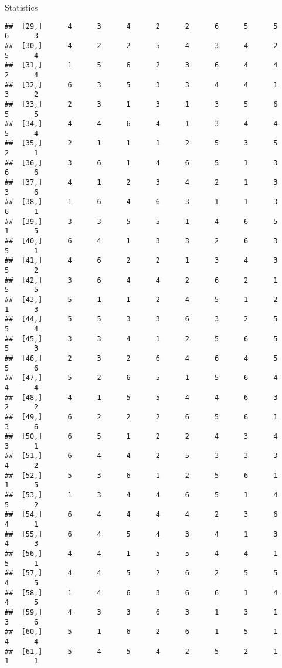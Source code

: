 \documentclass[
  ignorenonframetext,
]{beamer}
\begin{document}
\begin{frame}[fragile]{Statistics}
\begin{verbatim}
##  [29,]      4      3      4      2      2      6      5      5      6      3
##  [30,]      4      2      2      5      4      3      4      2      5      4
##  [31,]      1      5      6      2      3      6      4      4      2      4
##  [32,]      6      3      5      3      3      4      4      1      3      2
##  [33,]      2      3      1      3      1      3      5      6      5      5
##  [34,]      4      4      6      4      1      3      4      4      5      4
##  [35,]      2      1      1      1      2      5      3      5      2      1
##  [36,]      3      6      1      4      6      5      1      3      6      6
##  [37,]      4      1      2      3      4      2      1      3      3      6
##  [38,]      1      6      4      6      3      1      1      3      6      1
##  [39,]      3      3      5      5      1      4      6      5      1      5
##  [40,]      6      4      1      3      3      2      6      3      5      1
##  [41,]      4      6      2      2      1      3      4      3      5      2
##  [42,]      3      6      4      4      2      6      2      1      5      5
##  [43,]      5      1      1      2      4      5      1      2      1      3
##  [44,]      5      5      3      3      6      3      2      5      5      4
##  [45,]      3      3      4      1      2      5      6      5      5      3
##  [46,]      2      3      2      6      4      6      4      5      5      6
##  [47,]      5      2      6      5      1      5      6      4      4      4
##  [48,]      4      1      5      5      4      4      6      3      2      2
##  [49,]      6      2      2      2      6      5      6      1      3      6
##  [50,]      6      5      1      2      2      4      3      4      3      1
##  [51,]      6      4      4      2      5      3      3      3      4      2
##  [52,]      5      3      6      1      2      5      6      1      1      5
##  [53,]      1      3      4      4      6      5      1      4      5      2
##  [54,]      6      4      4      4      4      2      3      6      4      1
##  [55,]      6      4      5      4      3      4      1      3      4      3
##  [56,]      4      4      1      5      5      4      4      1      5      1
##  [57,]      4      4      5      2      6      2      5      5      4      5
##  [58,]      1      4      6      3      6      6      1      4      4      5
##  [59,]      4      3      3      6      3      1      3      1      3      6
##  [60,]      5      1      6      2      6      1      5      1      4      4
##  [61,]      5      4      5      4      2      5      2      1      1      1

\end{verbatim}
\end{frame}
\end{document}
